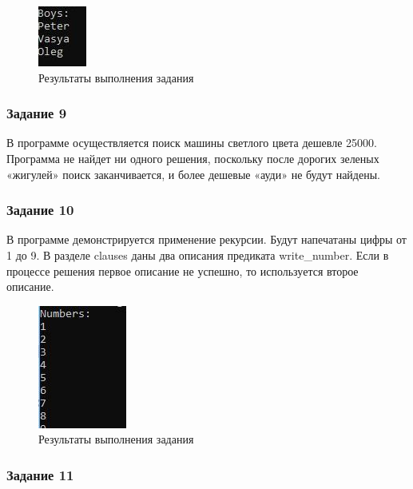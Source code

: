 \documentclass[14pt,a4paper,report]{report}
\begin{document}




\begin{figure}[h!]
	\centering
	\includegraphics[scale = 1.0]{images/d8.jpeg}
	\caption{Результаты выполнения задания}
\end{figure}

\subsubsection{Задание 9}

В программе осуществляется поиск машины светлого цвета дешевле 25000. Программа не найдет ни одного решения, поскольку после дорогих зеленых «жигулей» поиск заканчивается, и более дешевые «ауди» не будут найдены.




\subsubsection{Задание 10}

В программе демонстрируется применение рекурсии. Будут напечатаны цифры от 1 до 9. В разделе clauses даны два описания предиката write\_number. Если в процессе решения первое описание не успешно, то используется второе описание.



\begin{figure}[h!]
	\centering
	\includegraphics[scale = 1.0]{images/d10.jpeg}
	\caption{Результаты выполнения задания}
\end{figure}
\clearpage
\subsubsection{Задание 11}
\end{document}
